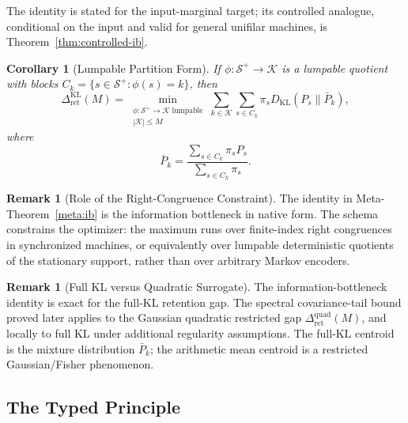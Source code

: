 \documentclass[12pt]{article}
\newtheorem{corollary}[theorem]{Corollary}
\theoremstyle{definition}
\newtheorem{remark}[theorem]{Remark}
\newcommand{\RetKL}{\Delta_{\mathrm{ret}}^{\mathrm{KL}}}
\newcommand{\RetQuad}{\Delta_{\mathrm{ret}}^{\mathrm{quad}}}
\newcommand{\Splus}{\mathcal S^{+}}
\begin{document}
The identity is stated for the input-marginal target; its controlled analogue,
conditional on the input and valid for general unifilar machines, is
Theorem~\ref{thm:controlled-ib}.

\begin{corollary}[Lumpable Partition Form]
\label{cor:ib-lumpable}
If $\phi:\Splus\to\mathcal K$ is a lumpable quotient with blocks
$C_k=\{s\in\Splus:\phi(s)=k\}$, then
\[
\RetKL(M)
=
\min_{\substack{
\phi:\Splus\to\mathcal K\ \text{lumpable}\\
|\mathcal K|\le M
}}
\sum_{k\in\mathcal K}
\sum_{s\in C_k}
\pi_s
D_{\mathrm{KL}}(P_s\|\bar P_k),
\]
where
\[
\bar P_k
=
\frac{
\sum_{s\in C_k}\pi_s P_s
}{
\sum_{s\in C_k}\pi_s
}.
\]
\end{corollary}

\begin{remark}[Role of the Right-Congruence Constraint]
\label{rem:ib-what-buys}
The identity in Meta-Theorem~\ref{meta:ib} is the information bottleneck \cite{tishby1999,bialek2001} in
native form.  The schema constrains the optimizer: the maximum runs over
finite-index right congruences in synchronized machines, or equivalently over
lumpable deterministic quotients of the stationary support, rather than over
arbitrary Markov encoders.
\end{remark}

\begin{remark}[Full KL versus Quadratic Surrogate]
\label{rem:ib-vs-quad}
The information-bottleneck identity is exact for the full-KL retention gap.
The spectral covariance-tail bound proved later applies to the Gaussian
quadratic restricted gap $\RetQuad(M)$, and locally to full KL under
additional regularity assumptions.  The full-KL centroid is the mixture
distribution $\bar P_k$; the arithmetic mean centroid is a restricted
Gaussian/Fisher phenomenon.
\end{remark}

\subsection{The Typed Principle}
\label{subsec:typed-principle}
\end{document}
